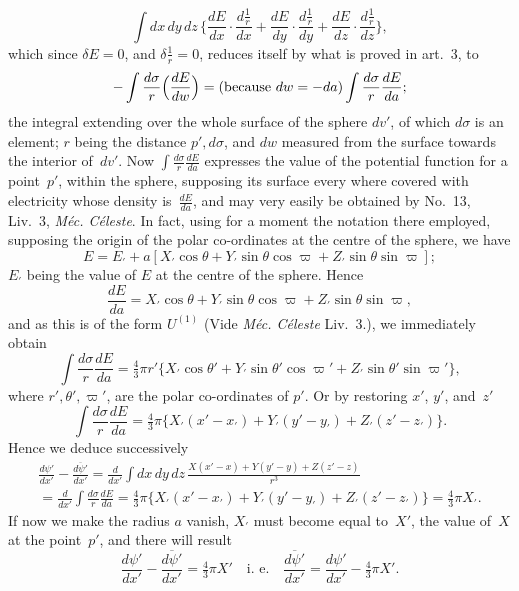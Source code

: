 \documentclass[12pt,notitlepage]{amsart}
\let\Title\textit
\begin{document}
\[
\int dx\,dy\,dz\,\biggl\{
  \frac{dE}{dx}\cdot\frac{d\frac1r}{dx}
  +\frac{dE}{dy}\cdot\frac{d\frac1r}{dy}
  +\frac{dE}{dz}\cdot\frac{d\frac1r}{dz}
\biggr\},
\]
which since $\delta E=0$, and $\delta\frac1r=0$,
reduces itself by what is proved in art.~3, to
\[
-\int\frac{d\sigma}{r}\Bigl(\frac{dE}{dw}\Bigr)
=\text{(because $dw=-da$)}
\int\frac{d\sigma}{r}\frac{dE}{da};
\]
the integral extending over the whole surface of the sphere $dv'$,
of which $d\sigma$
is an element; $r$ being the distance $p',d\sigma$,
and $dw$ measured from the surface
towards the interior of~$dv'$.
Now $\int\frac{d\sigma}{r}\frac{dE}{da}$ expresses the value of the potential
function for a point~$p'$, within the sphere, supposing its surface every where
covered with electricity whose density is~$\frac{dE}{da}$,
and may very easily be obtained
by No.~13, Liv.~3, \Title{M\'ec. C\'eleste}.
In fact, using for a moment the notation
there employed, supposing the origin of the polar co-ordinates at the centre
of the sphere, we have
\[
E=E_\prime+a[X_\prime\cos\theta
+Y_\prime\sin\theta\cos\varpi
+Z_\prime\sin\theta\sin\varpi];
\]
$E_\prime$ being the value of $E$ at the centre of the sphere. Hence
\[
\frac{dE}{da}=
X_\prime\cos\theta
+Y_\prime\sin\theta\cos\varpi
+Z_\prime\sin\theta\sin\varpi,
\]
and as this is of the form $U^{(1)}$ (Vide \Title{M\'ec. C\'eleste} Liv.~3.),
we immediately obtain
\[
\int\frac{d\sigma}{r}\frac{dE}{da}=\tfrac43\pi r'\{
X_\prime\cos\theta'
+Y_\prime\sin\theta'\cos\varpi'
+Z_\prime\sin\theta'\sin\varpi'\},
\]
where $r',\theta',\varpi'$, are the polar co-ordinates of $p'$.
Or by restoring $x'$, $y'$, and~$z'$
\[
\int\frac{d\sigma}{r}\frac{dE}{da}=\tfrac43\pi \bigl\{
  X_\prime(x'-x_\prime)
  +Y_\prime(y'-y_\prime)
  +Z_\prime(z'-z_\prime)\bigl\}.
\]
Hence we deduce successively
\begin{multline*}
\frac{{d\psi'}}{dx'}-\frac{\overline{d\psi'}}{dx'}
=\frac{d}{dx'}\int dx\,dy\,dz\,\frac{X(x'-x)+Y(y'-y)+Z(z'-z)}{r^3}\\
=\frac{d}{dx'}\int\frac{d\sigma}{r}\frac{dE}{da}
=\tfrac43\pi \bigl\{
  X_\prime(x'-x_\prime)
  +Y_\prime(y'-y_\prime)
  +Z_\prime(z'-z_\prime)\bigl\}
=\tfrac43\pi X_\prime.
\end{multline*}
If now we make the radius $a$ vanish,
$X_\prime$ must become equal to~$X'$, the value
of~$X$ at the point~$p'$, and there will result
\[
\frac{{d\psi'}}{dx'}-\frac{\overline{d\psi'}}{dx'}=\tfrac43\pi X'
\quad\text{i.~e.}\quad
\frac{\overline{d\psi'}}{dx'}=\frac{{d\psi'}}{dx'}-\tfrac43\pi X'.
\]
\end{document}
